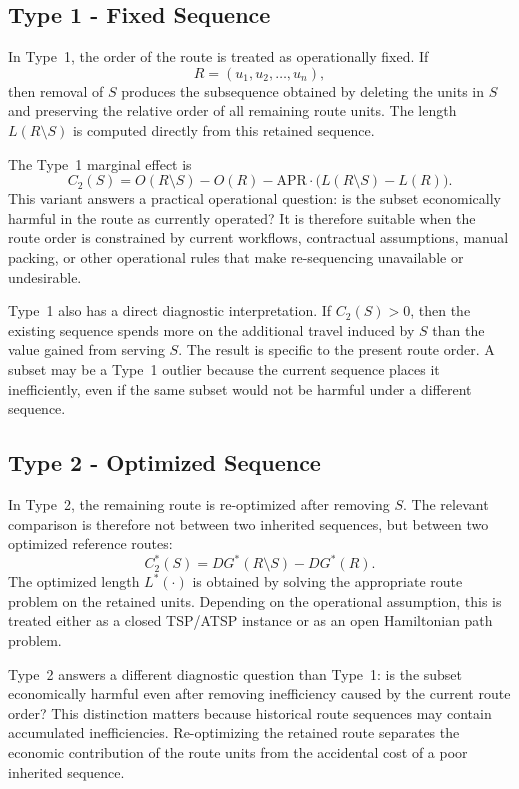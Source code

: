 \documentclass[preprint,12pt]{elsarticle}
\begin{document}
\subsection{Type 1 - Fixed Sequence}
\label{subsec:type-1-fixed-sequence}

In Type~1, the order of the route is treated as operationally fixed. If
\[
R=(u_1,u_2,\ldots,u_n),
\]
then removal of $S$ produces the subsequence obtained by deleting the units in $S$ and preserving the relative order of all remaining route units. The length $L(R\setminus S)$ is computed directly from this retained sequence.

The Type~1 marginal effect is
\[
C_2(S)=O(R\setminus S)-O(R)
-\mathrm{APR}\cdot\bigl(L(R\setminus S)-L(R)\bigr).
\]
This variant answers a practical operational question: is the subset economically harmful in the route as currently operated? It is therefore suitable when the route order is constrained by current workflows, contractual assumptions, manual packing, or other operational rules that make re-sequencing unavailable or undesirable.

Type~1 also has a direct diagnostic interpretation. If $C_2(S)>0$, then the existing sequence spends more on the additional travel induced by $S$ than the value gained from serving $S$. The result is specific to the present route order. A subset may be a Type~1 outlier because the current sequence places it inefficiently, even if the same subset would not be harmful under a different sequence.

\subsection{Type 2 - Optimized Sequence}
\label{subsec:type-2-optimized-sequence}

In Type~2, the remaining route is re-optimized after removing $S$. The relevant comparison is therefore not between two inherited sequences, but between two optimized reference routes:
\[
C_2^*(S)=DG^*(R\setminus S)-DG^*(R).
\]
The optimized length $L^*(\cdot)$ is obtained by solving the appropriate route problem on the retained units. Depending on the operational assumption, this is treated either as a closed TSP/ATSP instance or as an open Hamiltonian path problem.

Type~2 answers a different diagnostic question than Type~1: is the subset economically harmful even after removing inefficiency caused by the current route order? This distinction matters because historical route sequences may contain accumulated inefficiencies. Re-optimizing the retained route separates the economic contribution of the route units from the accidental cost of a poor inherited sequence.
\end{document}
